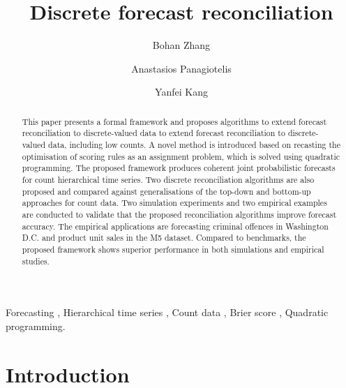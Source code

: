 \documentclass[a4paper,review,11pt,authoryear]{elsarticle}
\theoremstyle{definition}
\begin{document}
\begin{frontmatter}

  \title{Discrete forecast reconciliation}

  \author[label1]{Bohan Zhang}
  \address[label1]{School of Economics and Management, Beihang University, Beijing, China}
  \author[label2]{Anastasios Panagiotelis}

  \author[label1]{Yanfei Kang}
  \address[label2]{The University of Sydney Business School, NSW 2006, Australia}

  \begin{abstract}

    This paper presents a formal framework and proposes algorithms to extend forecast reconciliation to discrete-valued data to extend forecast reconciliation to discrete-valued data, including low counts. A novel method is introduced based on recasting the optimisation of scoring rules as an assignment problem, which is solved using quadratic programming. The proposed framework produces coherent joint probabilistic forecasts for count hierarchical time series.
    Two discrete reconciliation algorithms are also proposed and compared against generalisations of the top-down and bottom-up approaches for count data. Two simulation experiments and two empirical examples are conducted to validate that the proposed reconciliation algorithms improve forecast accuracy. The empirical applications are forecasting criminal offences in Washington D.C. and product unit sales in the M5 dataset. Compared to benchmarks, the proposed framework shows superior performance in both simulations and empirical studies.

  \end{abstract}

  \begin{keyword}
  Forecasting \sep
  Hierarchical time series \sep
  Count data \sep
  Brier score \sep
  Quadratic programming.
  \end{keyword}

\end{frontmatter}

\newpage
\linenumbers

\section{Introduction}
\end{document}

